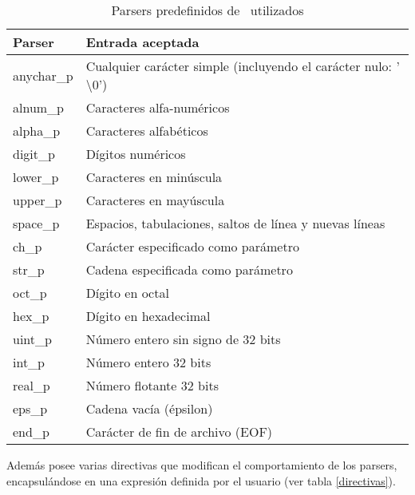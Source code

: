 \begin{table}[!ht]\centering\scriptsize
\begin{tabular}{| l | l |}
\hline

\rowcolor{gris} \textbf{Parser} & \textbf{Entrada aceptada} \\ \hline

anychar\_p & Cualquier carácter simple (incluyendo el carácter nulo: '$\setminus0$')\\ \hline
alnum\_p   & Caracteres alfa-numéricos \\ \hline
alpha\_p   & Caracteres alfabéticos \\ \hline
digit\_p   & Dígitos numéricos \\ \hline
lower\_p   & Caracteres en minúscula \\ \hline
upper\_p   & Caracteres en mayúscula \\ \hline
space\_p   & Espacios, tabulaciones, saltos de línea y nuevas líneas \\ \hline
ch\_p      & Carácter especificado como parámetro \\ \hline
str\_p     & Cadena especificada como parámetro \\ \hline
oct\_p     & Dígito en octal \\ \hline
hex\_p     & Dígito en hexadecimal \\ \hline
uint\_p    & Número entero sin signo de 32 bits \\ \hline
int\_p     & Número entero 32 bits \\ \hline
real\_p    & Número flotante 32 bits \\ \hline
eps\_p     & Cadena vacía (épsilon) \\ \hline
end\_p     & Carácter de fin de archivo (EOF) \\ \hline
\end{tabular}
\caption{\label{parsers} Parsers predefinidos de \spirit\ utilizados} 
\end{table}

Además posee varias directivas que modifican el comportamiento de los parsers, encapsulándose en una expresión definida por el usuario (ver tabla \ref{directivas}).

